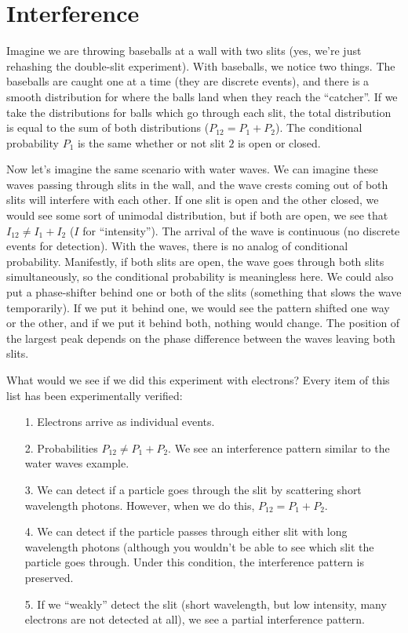 \documentclass[a4paper,twoside,master.tex]{subfiles}
\begin{document}

\section{Interference}%
\label{sec:interference}

Imagine we are throwing baseballs at a wall with two slits (yes, we're just rehashing the double-slit experiment). With baseballs, we notice two things. The baseballs are caught one at a time (they are discrete events), and there is a smooth distribution for where the balls land when they reach the ``catcher''. If we take the distributions for balls which go through each slit, the total distribution is equal to the sum of both distributions ($P_{12} = P_1 + P_2 $). The conditional probability $P_1 $ is the same whether or not slit $2$ is open or closed.

Now let's imagine the same scenario with water waves. We can imagine these waves passing through slits in the wall, and the wave crests coming out of both slits will interfere with each other. If one slit is open and the other closed, we would see some sort of unimodal distribution, but if both are open, we see that $I_{12} \neq I_1 + I_2$ ($I$ for ``intensity''). The arrival of the wave is continuous (no discrete events for detection). With the waves, there is no analog of conditional probability. Manifestly, if both slits are open, the wave goes through both slits simultaneously, so the conditional probability is meaningless here. We could also put a phase-shifter behind one or both of the slits (something that slows the wave temporarily). If we put it behind one, we would see the pattern shifted one way or the other, and if we put it behind both, nothing would change. The position of the largest peak depends on the phase difference between the waves leaving both slits.

What would we see if we did this experiment with electrons? Every item of this list has been experimentally verified:
\begin{itemize}
    \item[1.] Electrons arrive as individual events.
    \item[2.] Probabilities $P_{12} \neq P_1 + P_2$. We see an interference pattern similar to the water waves example.
    \item[3.] We can detect if a particle goes through the slit by scattering short wavelength photons. However, when we do this, $P_{12} = P_1 + P_2$.
    \item[4.] We can detect if the particle passes through either slit with long wavelength photons (although you wouldn't be able to see which slit the particle goes through. Under this condition, the interference pattern is preserved.
        \item[5.] If we ``weakly'' detect the slit (short wavelength, but low intensity, many electrons are not detected at all), we see a partial interference pattern.
\end{itemize}
\end{document}
